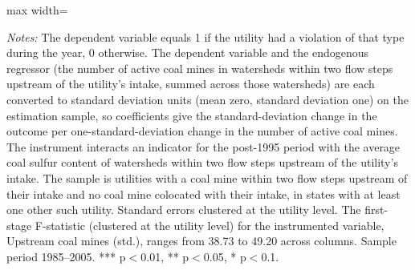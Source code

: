 \begin{table}[htbp]
{\begin{adjustbox}{max width=\linewidth}
\begin{tabular}
\bottomrule
\end{tabular}
\end{adjustbox}
}
\begin{minipage}{\linewidth}
\vspace{4pt}
\footnotesize
\raggedright
\textit{Notes:} The dependent variable equals 1 if the utility had a violation of that type during the year, 0 otherwise. The dependent variable and the endogenous regressor (the number of active coal mines in watersheds within two flow steps upstream of the utility's intake, summed across those watersheds) are each converted to standard deviation units (mean zero, standard deviation one) on the estimation sample, so coefficients give the standard-deviation change in the outcome per one-standard-deviation change in the number of active coal mines. The instrument interacts an indicator for the post-1995 period with the average coal sulfur content of watersheds within two flow steps upstream of the utility's intake. The sample is utilities with a coal mine within two flow steps upstream of their intake and no coal mine colocated with their intake, in states with at least one other such utility. Standard errors clustered at the utility level. The first-stage F-statistic (clustered at the utility level) for the instrumented variable, Upstream coal mines (std.), ranges from 38.73 to 49.20 across columns. Sample period 1985--2005. *** p$<$0.01, ** p$<$0.05, * p$<$0.1.
\end{minipage}
\end{table}

